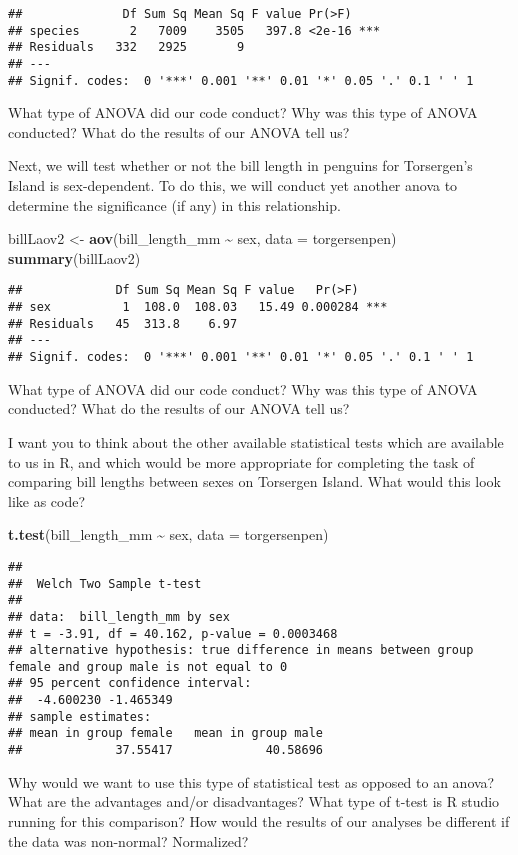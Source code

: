\documentclass[
]{article}
\newenvironment{Shaded}{\begin{snugshade}}{\end{snugshade}}
\newcommand{\AttributeTok}[1]{\textcolor[rgb]{0.13,0.29,0.53}{#1}}
\newcommand{\FunctionTok}[1]{\textcolor[rgb]{0.13,0.29,0.53}{\textbf{#1}}}
\newcommand{\NormalTok}[1]{#1}
\newcommand{\OtherTok}[1]{\textcolor[rgb]{0.56,0.35,0.01}{#1}}
\newcommand{\SpecialCharTok}[1]{\textcolor[rgb]{0.81,0.36,0.00}{\textbf{#1}}}
\begin{document}
\begin{verbatim}
##              Df Sum Sq Mean Sq F value Pr(>F)    
## species       2   7009    3505   397.8 <2e-16 ***
## Residuals   332   2925       9                   
## ---
## Signif. codes:  0 '***' 0.001 '**' 0.01 '*' 0.05 '.' 0.1 ' ' 1
\end{verbatim}

What type of ANOVA did our code conduct? Why was this type of ANOVA
conducted? What do the results of our ANOVA tell us?

Next, we will test whether or not the bill length in penguins for
Torsergen's Island is sex-dependent. To do this, we will conduct yet
another anova to determine the significance (if any) in this
relationship.

\begin{Shaded}
\begin{Highlighting}[]
\NormalTok{billLaov2 }\OtherTok{\textless{}{-}} \FunctionTok{aov}\NormalTok{(bill\_length\_mm }\SpecialCharTok{\textasciitilde{}}\NormalTok{ sex, }\AttributeTok{data =}\NormalTok{ torgersenpen)}
\FunctionTok{summary}\NormalTok{(billLaov2)}
\end{Highlighting}
\end{Shaded}

\begin{verbatim}
##             Df Sum Sq Mean Sq F value   Pr(>F)    
## sex          1  108.0  108.03   15.49 0.000284 ***
## Residuals   45  313.8    6.97                     
## ---
## Signif. codes:  0 '***' 0.001 '**' 0.01 '*' 0.05 '.' 0.1 ' ' 1
\end{verbatim}

What type of ANOVA did our code conduct? Why was this type of ANOVA
conducted? What do the results of our ANOVA tell us?

I want you to think about the other available statistical tests which
are available to us in R, and which would be more appropriate for
completing the task of comparing bill lengths between sexes on Torsergen
Island. What would this look like as code?

\begin{Shaded}
\begin{Highlighting}[]
\FunctionTok{t.test}\NormalTok{(bill\_length\_mm }\SpecialCharTok{\textasciitilde{}}\NormalTok{ sex, }\AttributeTok{data =}\NormalTok{ torgersenpen)}
\end{Highlighting}
\end{Shaded}

\begin{verbatim}
## 
##  Welch Two Sample t-test
## 
## data:  bill_length_mm by sex
## t = -3.91, df = 40.162, p-value = 0.0003468
## alternative hypothesis: true difference in means between group female and group male is not equal to 0
## 95 percent confidence interval:
##  -4.600230 -1.465349
## sample estimates:
## mean in group female   mean in group male 
##             37.55417             40.58696
\end{verbatim}

Why would we want to use this type of statistical test as opposed to an
anova? What are the advantages and/or disadvantages? What type of t-test
is R studio running for this comparison? How would the results of our
analyses be different if the data was non-normal? Normalized?
\end{document}
